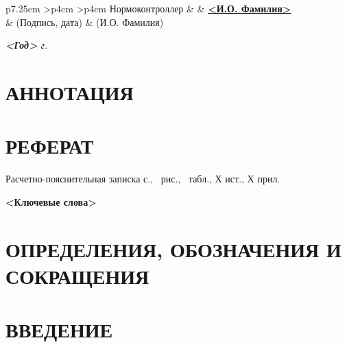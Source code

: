 \documentclass[utf8x, 14pt, oneside, a4paper]{article}
\begin{document}
\begin{titlepage}
\begin{table}[h!]
			\vspace{\baselineskip}

			\begin{signstabular}[0.7]{p{7.25cm} >{\centering\arraybackslash}p{4cm} >{\centering\arraybackslash}p{4cm}}
				Нормоконтроллер & \uline{\hspace*{4cm}} & \uline{\hfill \textbf{<И.О. Фамилия>} \hfill} \\
				& \scriptsize (Подпись, дата) & \scriptsize (И.О. Фамилия)
			\end{signstabular}
		\end{table}

		\vfill

		\begin{center}
			\normalsize \textit{\textbf{<Год>} г.}
		\end{center}
	\end{titlepage}

	\normalsize
	\setcounter{page}{4}
	\section*{АННОТАЦИЯ}

	\pagebreak

	\section*{РЕФЕРАТ}
		\begin{center}
			Расчетно-пояснительная записка \pageref{LastPage} с., \totalfigures\ рис., \totaltables\ табл., Х ист., Х прил.

			\textbf{<Ключевые слова>}
		\end{center}

		\pagebreak

	\renewcommand{\contentsname}{\normalsize\bfseries\centering СОДЕРЖАНИЕ}
	\small
	\tableofcontents
	\normalsize

		\pagebreak

	\section*{ОПРЕДЕЛЕНИЯ, ОБОЗНАЧЕНИЯ И СОКРАЩЕНИЯ}

		\pagebreak

	\section*{ВВЕДЕНИЕ}
\end{document}
